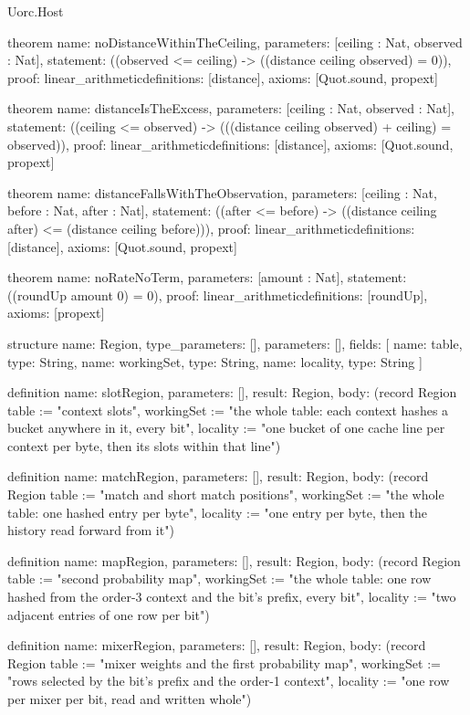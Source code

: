 \begin{lexlean}{Uorc.Host}
\begin{semanticmodule}
theorem{
  name: noDistanceWithinTheCeiling,
  parameters: [ceiling : Nat, observed : Nat],
  statement: ((observed <= ceiling) -> ((distance ceiling observed) = 0)),
  proof: linear_arithmetic{definitions: [distance]},
  axioms: [Quot.sound, propext]
}

theorem{
  name: distanceIsTheExcess,
  parameters: [ceiling : Nat, observed : Nat],
  statement: ((ceiling <= observed) -> (((distance ceiling observed) + ceiling) = observed)),
  proof: linear_arithmetic{definitions: [distance]},
  axioms: [Quot.sound, propext]
}

theorem{
  name: distanceFallsWithTheObservation,
  parameters: [ceiling : Nat, before : Nat, after : Nat],
  statement: ((after <= before) -> ((distance ceiling after) <= (distance ceiling before))),
  proof: linear_arithmetic{definitions: [distance]},
  axioms: [Quot.sound, propext]
}

theorem{
  name: noRateNoTerm,
  parameters: [amount : Nat],
  statement: ((roundUp amount 0) = 0),
  proof: linear_arithmetic{definitions: [roundUp]},
  axioms: [propext]
}

structure{
  name: Region,
  type_parameters: [],
  parameters: [],
  fields: [
    {name: table, type: String},
    {name: workingSet, type: String},
    {name: locality, type: String}
  ]
}

definition{
  name: slotRegion,
  parameters: [],
  result: Region,
  body: (record Region {table := "context slots", workingSet := "the whole table: each context hashes a bucket anywhere in it, every bit", locality := "one bucket of one cache line per context per byte, then its slots within that line"})
}

definition{
  name: matchRegion,
  parameters: [],
  result: Region,
  body: (record Region {table := "match and short match positions", workingSet := "the whole table: one hashed entry per byte", locality := "one entry per byte, then the history read forward from it"})
}

definition{
  name: mapRegion,
  parameters: [],
  result: Region,
  body: (record Region {table := "second probability map", workingSet := "the whole table: one row hashed from the order-3 context and the bit's prefix, every bit", locality := "two adjacent entries of one row per bit"})
}

definition{
  name: mixerRegion,
  parameters: [],
  result: Region,
  body: (record Region {table := "mixer weights and the first probability map", workingSet := "rows selected by the bit's prefix and the order-1 context", locality := "one row per mixer per bit, read and written whole"})
}


\end{semanticmodule}
\end{lexlean}
